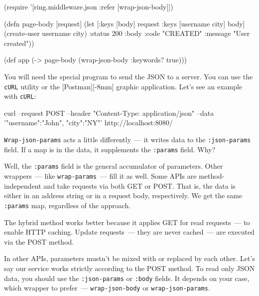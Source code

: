 \else

\begin{english}
  \begin{clojure}
(require '[ring.middleware.json :refer [wrap-json-body]])

(defn page-body [request]
  (let [{:keys [body]} request
        {:keys [username city]} body]
    (create-user username city)
    {:status 200
     :body {:code "CREATED"
            :message "User created"}}))

(def app (-> page-body
             (wrap-json-body {:keywords? true})))
  \end{clojure}
\end{english}

\fi


You will need the special program to send the JSON to a server. You can use the \verb|cURL| utility or the [Post\-man][-8mm] graphic application.  Let's see an example with \verb|cURL|:

\begin{english}
  \begin{bash}
curl --request POST
     --header "Content-Type:
                 application/json"
     --data '{"username":"John",
                      "city":"NY"}'
     http://localhost:8080/
  \end{bash}
\end{english}

\verb|Wrap-json-params| acts a little differently~--- it writes data to the \verb|:json-params| field. If a map is in the data, it supplements the \verb|:params| field. Why?

Well, the \verb|:params| field is the general accumulator of parameters. Other wrappers~--- like \verb|wrap-params|~--- fill it as well. Some APIs are method-independent and take requests via both GET or POST. That is, the data is either in an address string or in a request body, respectively. We get the same \verb|:params| map, regardless of the approach.

The hybrid method works better because it applies GET for read requests~--- to enable HTTP caching.  Update requests~--- they are never cached~--- are executed
via the POST method.

In other APIs, parameters mustn't be mixed with or replaced by each other. Let's say our service works strictly according to the POST method. To read only JSON data, you should use the \verb|:json-params| or \verb|:body| fields. It depends on your case, which wrapper to prefer~--- \verb|wrap-json-body| or \verb|wrap-json-params|.

